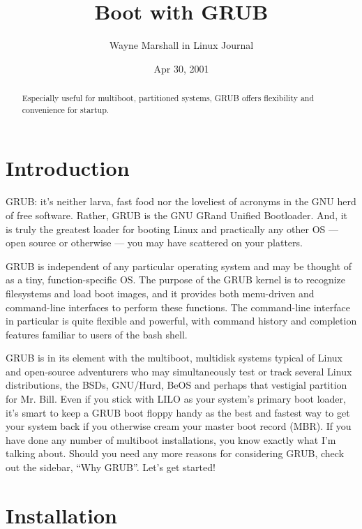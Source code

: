\documentclass{article}
\begin{document}
\title{Boot with GRUB}
\author{Wayne Marshall in Linux Journal}
\date{Apr 30, 2001}

\maketitle

\begin{abstract}
Especially useful for multiboot, partitioned systems, GRUB offers flexibility and convenience for startup.
\end{abstract}

\section{Introduction}

GRUB: it's neither larva, fast food nor the loveliest of acronyms in the GNU herd of free software. Rather, GRUB is the GNU GRand Unified Bootloader. And, it is truly the greatest loader for booting Linux and practically any other OS — open source or otherwise — you may have scattered on your platters.

GRUB is independent of any particular operating system and may be thought of as a tiny, function-specific OS. The purpose of the GRUB kernel is to recognize filesystems and load boot images, and it provides both menu-driven and command-line interfaces to perform these functions. The command-line interface in particular is quite flexible and powerful, with command history and completion features familiar to users of the bash shell.

GRUB is in its element with the multiboot, multidisk systems typical of Linux and open-source adventurers who may simultaneously test or track several Linux distributions, the BSDs, GNU/Hurd, BeOS and perhaps that vestigial partition for Mr. Bill. Even if you stick with LILO as your system's primary boot loader, it's smart to keep a GRUB boot floppy handy as the best and fastest way to get your system back if you otherwise cream your master boot record (MBR). If you have done any number of multiboot installations, you know exactly what I'm talking about. Should you need any more reasons for considering GRUB, check out the sidebar, “Why GRUB”. Let's get started!

\section{Installation}
\end{document}
